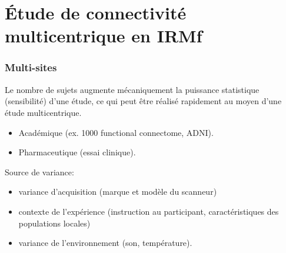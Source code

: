\documentclass{beamer}
\begin{document}
\section{Étude de connectivité multicentrique en IRMf} %
\frame{\sectionpage}
\begin{frame}
\frametitle{Multi-sites}
Le nombre de sujets augmente mécaniquement la puissance statistique (sensibilité) d’une étude, ce qui peut être réalisé rapidement au moyen d'une étude multicentrique.
\begin{itemize}
\item Académique (ex. 1000 functional connectome, ADNI).
\item Pharmaceutique (essai clinique).
\end{itemize}

Source de variance: 
\begin{itemize}
\item variance d'acquisition (marque et modèle du scanneur)
\item contexte de l'expérience (instruction au participant, caractéristiques des populations locales)
\item variance de l'environnement (son, température).
\end{itemize}
\end{frame}
\end{document}
